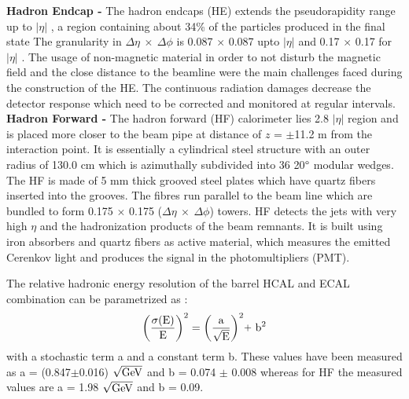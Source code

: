 {\bf Hadron Endcap -} The hadron endcaps (HE) extends the pseudorapidity range up to $|\eta|$ , a region containing about 34\% of the particles produced in the final state The granularity in $\Delta\eta~\times~\Delta\phi$ is 0.087 $\times$ 0.087 upto $|\eta|$  and 0.17 $\times$ 0.17 for $|\eta|$ . The usage of non-magnetic material in order to not disturb the magnetic field and the close distance to the beamline were the main challenges faced during the construction of the HE. The continuous radiation damages decrease the detector response which need to be corrected and monitored at regular intervals. \\ \newline
{\bf Hadron Forward -} The hadron forward (HF) calorimeter lies 2.8 \ls $|\eta|$  region and is placed more closer to the beam pipe at distance of $z$ = $\pm$11.2 m from the interaction point. It is essentially a cylindrical steel structure with an outer radius of 130.0 cm which is azimuthally subdivided into 36 20$\degree$ modular wedges. The HF is made of 5 mm thick grooved steel plates which have quartz fibers inserted into the grooves. The fibres run parallel to the beam line which are bundled to form 0.175 $\times$ 0.175 ($\Delta\eta~\times~\Delta\phi$) towers. HF detects the jets with very high $\eta$ and the hadronization products of the beam remnants. It is built using iron absorbers and quartz fibers as active material, which measures the emitted Cerenkov light and produces the signal in the photomultipliers (PMT).

The relative hadronic energy resolution of the barrel HCAL and ECAL combination can be parametrized as :
\begin{equation}
{\rm \bigg(\frac{\sigma(E)}{E}\bigg)^2 = \bigg(\frac{a}{\sqrt{E}}\bigg)^2 \plus b^2}
\end{equation}
with a stochastic term a and a constant term b. These values have been measured \cite{Chatrchyan:2009ag} as a = (0.847$\pm$0.016) $\sqrt{\rm GeV}$ and b = 0.074 $\pm$ 0.008 whereas for HF the measured values are a = 1.98 $\sqrt{\rm GeV}$ and b = 0.09.


